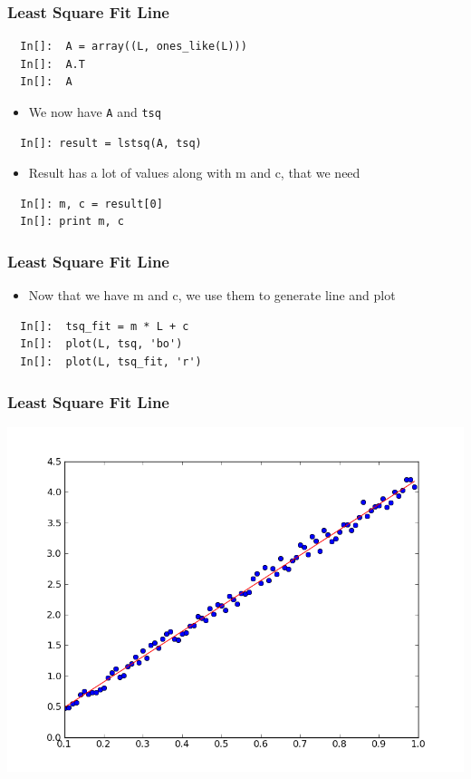 \begin{frame}[fragile]
  \frametitle{Least Square Fit Line}
  \begin{lstlisting}
  In[]:  A = array((L, ones_like(L)))
  In[]:  A.T
  In[]:  A
  \end{lstlisting}
  \begin{itemize}
  \item We now have \texttt{A} and \texttt{tsq}
  \end{itemize}
  \begin{lstlisting}
  In[]: result = lstsq(A, tsq)
  \end{lstlisting}
  \begin{itemize}
  \item Result has a lot of values along with m and c, that we need
  \end{itemize}
  \begin{lstlisting}
  In[]: m, c = result[0]
  In[]: print m, c
  \end{lstlisting}
\end{frame}

\begin{frame}[fragile]
  \frametitle{Least Square Fit Line}
  \begin{itemize}
  \item Now that we have m and c, we use them to generate line and plot
  \end{itemize}
  \begin{lstlisting}
  In[]:  tsq_fit = m * L + c
  In[]:  plot(L, tsq, 'bo')
  In[]:  plot(L, tsq_fit, 'r')
  \end{lstlisting}
\end{frame}

\begin{frame}
\frametitle{Least Square Fit Line}
\includegraphics[scale=0.45]{../advanced_python/images/lst-sq-fit.png}\\
\end{frame}


